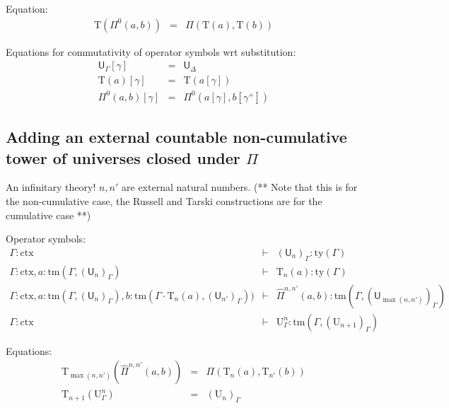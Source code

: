 \documentclass{lmcs}
\def\UU{\mathrm{U}}
\def\Ta{\mathrm{T}}
\def\Pihat{\hat{\Pi}}
\newcommand{\ctx}{\mathrm{ctx}}
\newcommand{\ty}{\mathrm{ty}}
\newcommand{\tm}{\mathrm{tm}}
\def\U{\mathsf{U}}
\begin{document}
Equation:
\begin{eqnarray*}
\Ta(\Pi^0(a,b)) &=& \Pi(\Ta(a),\Ta(b))
\end{eqnarray*}

 Equations for commutativity of operator symbols wrt substitution:
 \begin{eqnarray*}
{\U}_\Gamma [ \gamma ] &=& {\U}_\Delta\\
\Ta(a) [ \gamma ] &=& \Ta(a[ \gamma ] )\\
\Pi^0(a,b)[ \gamma ] &=& \Pi^0(a [ \gamma ], b[ \gamma^+ ])
\end{eqnarray*}

\subsection{Adding an external countable non-cumulative tower of universes closed under $\Pi$}

An infinitary theory! $n, n'$ are external natural numbers. (** Note that this is for the non-cumulative case, the Russell and Tarski constructions are for the cumulative case **)

Operator symbols:
\begin{eqnarray*}
\Gamma : \ctx &\vdash& (\U_n)_\Gamma : \ty(\Gamma)\\
\Gamma : \ctx, a : \tm(\Gamma,(\U_n)_\Gamma) &\vdash& {\Ta_n}(a) : \ty(\Gamma)\\
\Gamma : \ctx,
a : \tm(\Gamma,(\U_n)_\Gamma),
b :  \tm(\Gamma \cdot \Ta_n(a), (\U_{n'})_\Gamma))
&\vdash&
 \Pihat^{n,n'}(a,b) : \tm(\Gamma,(\U_{\max(n,n')})_\Gamma)\\
\Gamma : \ctx&\vdash&\UU^n_\Gamma: \tm(\Gamma,(\UU_{n+1})_\Gamma)
\end{eqnarray*}

Equations:
\begin{eqnarray*}
\Ta_{\max(n,n')}(\Pihat^{n,n'}(a,b)) &=& \Pi(\Ta_n(a),\Ta_{n'}(b))\\
\Ta_{n+1}(\UU^n_\Gamma) &=& (\UU_n)_\Gamma
\end{eqnarray*}
\end{document}
